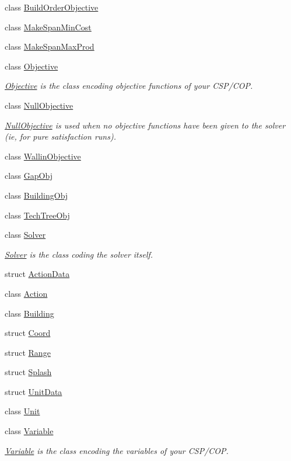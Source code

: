 \begin{DoxyCompactItemize}
class \hyperlink{classghost_1_1BuildOrderObjective}{Build\-Order\-Objective}
\item 
class \hyperlink{classghost_1_1MakeSpanMinCost}{Make\-Span\-Min\-Cost}
\item 
class \hyperlink{classghost_1_1MakeSpanMaxProd}{Make\-Span\-Max\-Prod}
\item 
class \hyperlink{classghost_1_1Objective}{Objective}
\begin{DoxyCompactList}\small\item\em \hyperlink{classghost_1_1Objective}{Objective} is the class encoding objective functions of your C\-S\-P/\-C\-O\-P. \end{DoxyCompactList}\item 
class \hyperlink{classghost_1_1NullObjective}{Null\-Objective}
\begin{DoxyCompactList}\small\item\em \hyperlink{classghost_1_1NullObjective}{Null\-Objective} is used when no objective functions have been given to the solver (ie, for pure satisfaction runs). \end{DoxyCompactList}\item 
class \hyperlink{classghost_1_1WallinObjective}{Wallin\-Objective}
\item 
class \hyperlink{classghost_1_1GapObj}{Gap\-Obj}
\item 
class \hyperlink{classghost_1_1BuildingObj}{Building\-Obj}
\item 
class \hyperlink{classghost_1_1TechTreeObj}{Tech\-Tree\-Obj}
\item 
class \hyperlink{classghost_1_1Solver}{Solver}
\begin{DoxyCompactList}\small\item\em \hyperlink{classghost_1_1Solver}{Solver} is the class coding the solver itself. \end{DoxyCompactList}\item 
struct \hyperlink{structghost_1_1ActionData}{Action\-Data}
\item 
class \hyperlink{classghost_1_1Action}{Action}
\item 
class \hyperlink{classghost_1_1Building}{Building}
\item 
struct \hyperlink{structghost_1_1Coord}{Coord}
\item 
struct \hyperlink{structghost_1_1Range}{Range}
\item 
struct \hyperlink{structghost_1_1Splash}{Splash}
\item 
struct \hyperlink{structghost_1_1UnitData}{Unit\-Data}
\item 
class \hyperlink{classghost_1_1Unit}{Unit}
\item 
class \hyperlink{classghost_1_1Variable}{Variable}
\begin{DoxyCompactList}\small\item\em \hyperlink{classghost_1_1Variable}{Variable} is the class encoding the variables of your C\-S\-P/\-C\-O\-P. \end{DoxyCompactList}\end{DoxyCompactItemize}
